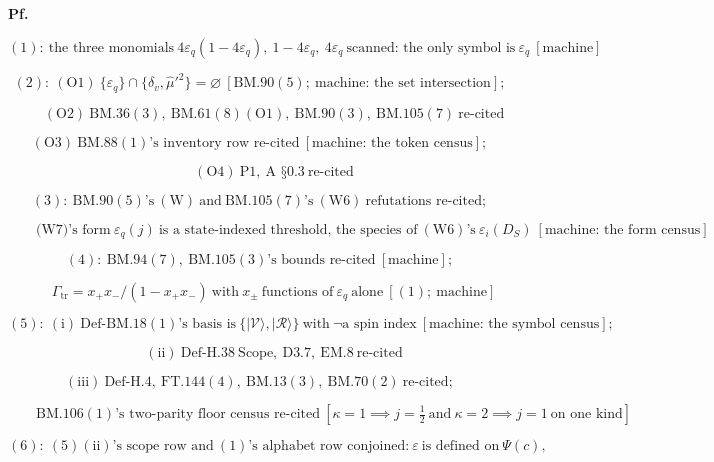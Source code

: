 \documentclass[11pt,openany]{report}
\theoremstyle{canonplain}
\theoremstyle{canondef}
\begin{document}
\textbf{Pf.}

\[
(1):\ \text{the three monomials}\ 4\varepsilon_q(1-4\varepsilon_q),\ 1-4\varepsilon_q,\ 4\varepsilon_q\ \text{scanned: the only symbol is}\ \varepsilon_q\ [\text{machine}]
\]

\[
(2):\ (\mathrm O1)\ \{\varepsilon_q\}\cap\{\delta_v,\hat\mu'^2\}=\varnothing\ [\mathrm{BM.90}(5);\ \text{machine: the set intersection}];
\]

\[
\qquad (\mathrm O2)\ \mathrm{BM.36}(3),\ \mathrm{BM.61}(8)(\mathrm{O1}),\ \mathrm{BM.90}(3),\ \mathrm{BM.105}(7)\ \text{re-cited}
\]

\[
(\mathrm O3)\ \mathrm{BM.88}(1)\text{'s inventory row re-cited}\ [\text{machine: the token census}];
\]

\[
\qquad (\mathrm O4)\ \mathrm{P1},\ \text{A §0.3}\ \text{re-cited}
\]

\[
(3):\ \mathrm{BM.90}(5)\text{'s}\ (\mathrm W)\ \text{and}\ \mathrm{BM.105}(7)\text{'s}\ (\mathrm{W6})\ \text{refutations re-cited};
\]

\[
\qquad \text{(W7)'s form}\ \varepsilon_q(j)\ \text{is a state-indexed threshold, the species of}\ (\mathrm{W6})\text{'s}\ \varepsilon_i(D_S)\ [\text{machine: the form census}]
\]

\[
(4):\ \mathrm{BM.94}(7),\ \mathrm{BM.105}(3)\text{'s bounds re-cited}\ [\text{machine}];
\]

\[
\qquad \Gamma_{\mathrm{tr}}=x_+x_-/(1-x_+x_-)\ \text{with}\ x_\pm\ \text{functions of}\ \varepsilon_q\ \text{alone}\ [(1);\ \text{machine}]
\]

\[
(5):\ (\mathrm i)\ \mathrm{Def\text{-}BM.18}(1)\text{'s basis is}\ \{|\mathcal V\rangle,|\mathcal R\rangle\}\ \text{with}\ \neg\text{a spin index}\ [\text{machine: the symbol census}];
\]

\[
\qquad (\mathrm{ii})\ \mathrm{Def\text{-}H.38}\ \text{Scope},\ \mathrm{D3.7},\ \mathrm{EM.8}\ \text{re-cited}
\]

\[
(\mathrm{iii})\ \mathrm{Def\text{-}H.4},\ \mathrm{FT.144}(4),\ \mathrm{BM.13}(3),\ \mathrm{BM.70}(2)\ \text{re-cited};
\]

\[
\qquad \mathrm{BM.106}(1)\text{'s two-parity floor census re-cited}\ [\kappa=1\implies j=\tfrac12\ \text{and}\ \kappa=2\implies j=1\ \text{on one kind}]
\]

\[
(6):\ (5)(\mathrm{ii})\text{'s scope row and}\ (1)\text{'s alphabet row conjoined:}\ \varepsilon\ \text{is defined on}\ \Psi(c),
\]
\end{document}
